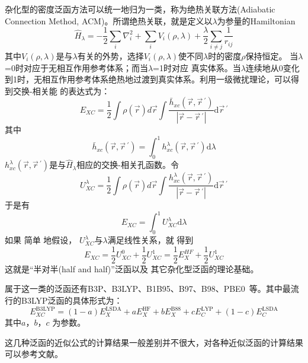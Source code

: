 杂化型的密度泛函方法可以统一地归为一类，称为绝热关联方法(Adiabatic Connection Method, ACM)。所谓绝热关联，就是定义以$\lambda$为参量的Hamiltonian
\begin{equation}
  \hat H_{\lambda}=-\dfrac12\sum_i\nabla_i^2+\sum_iV_i(\rho,\lambda)+\dfrac{\lambda}2\sum_{i\neq j}\dfrac1{r_{ij}}
  \label{eq:dft-27}
\end{equation}
其中$V_i(\rho,\lambda)$是与$\lambda$有关的外势，选择$V_i(\rho,\lambda)$使不同$\lambda$时的密度$\rho$保持恒定。%
当$\lambda$=0时对应于无相互作用参考体系；而当$\lambda$=1时对应%
真实体系。当$\lambda$连续地从0变化到1时，无相互作用参考体系绝热地过渡到真实体系。利用一级微扰理论\cite{JCP88-1053_1988}，可以得到交换-相关能%
{的}表达式为：
$$E_{XC}=\dfrac12\int\rho(\vec r)d\vec r\int\dfrac{\bar h_{xc}(\vec r,\vec r\,^{\prime})}{|\vec r-\vec r\,^{\prime}|}\textrm{d}\vec r\,^{\prime}$$
其中$$\bar h_{xc}(\vec r,\vec r\,^{\prime})=\int_0^1h_{xc}^{\lambda}(\vec r,\vec r\,^{\prime})\textrm{d}\lambda$$
$h_{xc}^{\lambda}(\vec r,\vec r\,^{\prime})$是与$\hat H_{\lambda}$相应的交换-相关孔函数。令
$$U_{XC}^{\lambda}=\dfrac12\int\rho(\vec r)d\vec r\int\dfrac{h_{xc}^{\lambda}(\vec r,\vec r\,^{\prime})}{|\vec r-\vec r\,^{\prime}|}\textrm{d}\vec r\,^{\prime}$$
于是有$$E_{XC}=\int_0^1U_{XC}^{\lambda}\textrm{d}\lambda$$
如果%
简单%
{地}假设，%
$U_{XC}^{\lambda}$与$\lambda$满足线性关系，就%
得到
$$E_{XC}=\dfrac12U_{XC}^0+\dfrac12U_{XC}^1=\dfrac12E_X^{HF}+\dfrac12U_{XC}^1$$
这就是“半对半(half and half)”泛函以及%
{其它}杂化型泛函的理论基础。

属于这一类的泛函还有B3P\cite{JCP98-5648_1993}、B3LYP\cite{JPC98-11623_1994}、B1B95\cite{JCP104-1040_1995}、B97\cite{JCP107-8554_1997}、B98\cite{JCP109-2092_1998}、PBE0\cite{JCP110-6158_1999}~等。其中最流行的B3LYP泛函的具体形式为：
$$E_{XC}^{\mathrm{B3LYP}}=(1-a)E_X^{\mathrm{LSDA}}+aE_X^{\mathrm{HF}}+bE_X^{\mathrm{B88}}+cE_C^{\mathrm{LYP}}+(1-c)E_C^{\mathrm{LSDA}}$$
其中$a$，$b$，$c$%
为参数。

这几种泛函的近似公式的计算结果{一般}差别并不很大，对各种近似泛函的计算结果可以参考文献。

